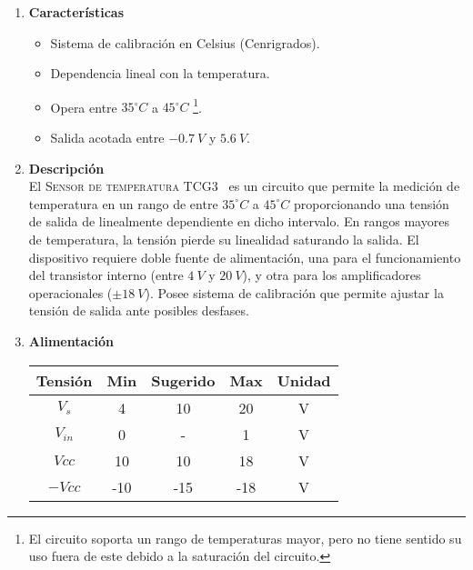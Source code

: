 

\begin{enumerate}
	\item[1] \textbf{Características}
	\begin{itemize}
		\item Sistema de calibración en Celsius (Cenrigrados).
		\item Dependencia lineal con la temperatura.
		\item Opera entre $35^{\circ}C$ a $45^{\circ}C$ \footnote{El circuito soporta un rango de temperaturas mayor, pero no tiene sentido su uso fuera de este debido a la saturación del circuito.}.
		\item Salida acotada entre $-0.7 \ V$ y $5.6 \ V$.
	\end{itemize}
	
	\item[2] \textbf{Descripción}\\
		El \textsc{Sensor de temperatura TCG3~\textsuperscript{\textregistered}} es un circuito que permite la medición de temperatura en un rango de entre $35^{\circ}C$ a $45^{\circ}C$ proporcionando una tensión de salida de linealmente dependiente en dicho intervalo. En rangos mayores de temperatura, la tensión pierde su linealidad saturando la salida. El dispositivo requiere doble fuente de alimentación, una para el funcionamiento del transistor interno (entre $4 \ V$ y $20 \ V$), y otra para los amplificadores operacionales ($\pm 18 \ V$). Posee sistema de calibración que permite ajustar la tensión de salida ante posibles desfases.
	
	\item[3] \textbf{Alimentación}\\
	\begin{table}[H]
		\begin{tabular}{ccccc}
			\hline
			Tensión & Min & Sugerido & Max & Unidad \\
			\hline
			$V_s$       & 4   	& 10       & 20  	& V \\
			$V_{in}$    & 0 	& -		   & 1	 	& V \\
			$Vcc$       & 10  	& 10       & 18 	& V \\
			$-Vcc$      & -10 	& -15      & -18 	& V	\\
			\hline
		\end{tabular}
	\end{table}
		

\end{enumerate}
